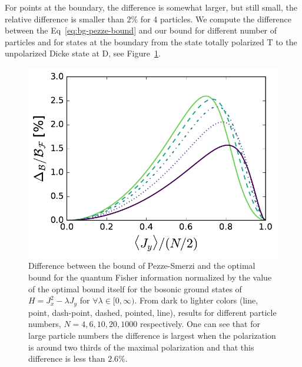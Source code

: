 For points at the boundary, the difference is somewhat larger, but still small, the relative difference is smaller than $2\%$ for 4 particles.
We compute the difference between the Eq~\eqref{eq:bg-pezze-bound} and our bound for different number of particles and for states at the boundary from the state totally polarized T to the unpolarized Dicke state at D, see Figure~\ref{fig:lt-edge-diff}.
\begin{figure}[htp]
  \centering
  \includegraphics[scale=.65]{img/plots/LT_edge_diff.pdf}
  \caption[Boundary difference of optimal bound versus Pezz\'e-Smerzi bound.]{Difference between the bound of Pezze-Smerzi and the optimal bound for the quantum Fisher information normalized by the value of the optimal bound itself for the bosonic ground states of $H=J_x^2-\lambda J_y$ for $\forall \lambda \in [0,\infty)$.
  From dark to lighter colors (line, point, dash-point, dashed, pointed, line), results for different particle numbers, $N=4,6,10,20,1000$ respectively.
  One can see that for large particle numbers the difference is largest when the polarization is around two thirds of the maximal polarization and that this difference is less than $2.6\%$.}
  \label{fig:lt-edge-diff}
\end{figure}

